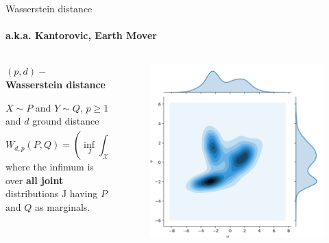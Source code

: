 \documentclass[9 pt]{beamer}
\begin{document}
\begin{frame}{Wasserstein distance}
\framesubtitle{a.k.a. Kantorovic, Earth Mover}
\begin{columns}

\begin{column}{0.49\textwidth}

\textbf{\color{light} $(p,d)-$ Wasserstein distance}
\vspace{0.25cm}

$X \sim {P}$ and $Y \sim {Q}$, $p \geqslant 1$ and $d$ ground distance $$W_{d, p}(P,Q) = \left( \inf_{J}  \int_{\mathcal{X} \times \mathcal{Y}} \!\!\!\!\!\! d(x,y)^{p} \,\,\, \text{d}J(x,y)\right)^{1/p}$$ where the infimum is over \textbf{all joint} distributions $\text{J}$ having $P$ and $Q$ as marginals.
\end{column}

\begin{column}{0.49\textwidth}
\begin{figure}
    \centering
    \includegraphics[width = .9\textwidth]{images/transp-plan.png}
\end{figure}

\end{column}

\end{columns}



\end{frame}
\end{document}
